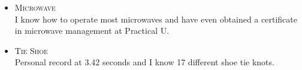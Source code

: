 





\begin{itemize}[leftmargin=7mm, itemsep=2mm, parsep=0mm]
	\item[\lline{olofblue}] {\fontsize{11}{0}\textsc{Microwave}}
	 \\
	{\small I know how to operate most microwaves and have even obtained a certificate in microwave management at Practical U.} 
    
	\item[\lline{olofblue}] {\fontsize{11}{0}\textsc{Tie Shoe}}
	 \\
	{\small Personal record at 3.42 seconds and I know 17 different shoe tie knots.}
\end{itemize}

